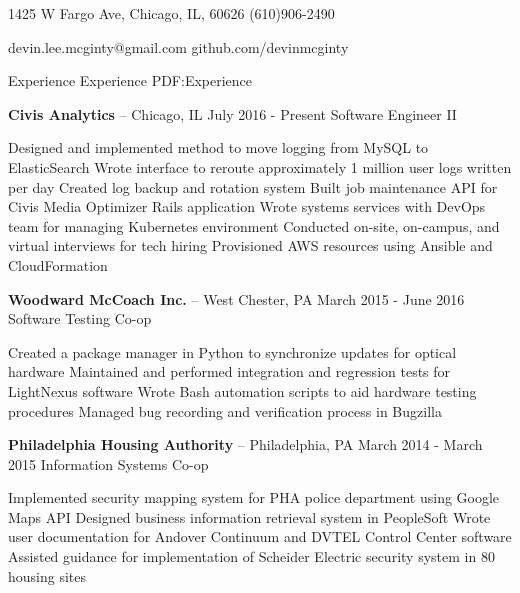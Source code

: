 \documentclass[letterpaper,MMMyyyy,nonstopmode]{simpleresumecv}
\newcommand{\CVAuthor}{Devin McGinty}
\begin{document}

\Title{\CVAuthor}

\bigskip
\begin{SubTitle}
1425 W Fargo Ave, Chicago, IL, 60626
\hfill
(610)906-2490
\par
devin.lee.mcginty@gmail.com
\hfill
github.com/devinmcginty
\end{SubTitle}

\begin{Body}


\Section
{Experience}
{Experience}
{PDF:Experience}

\Gap
\Entry
\textbf{Civis Analytics} -- Chicago, IL
\hfill
July 2016 - Present
\Gap
Software Engineer II
\medskip
\begin{Detail}
    \BulletItem
    Designed and implemented method to move logging from MySQL to ElasticSearch
        \SubBulletItem
        Wrote interface to reroute approximately 1 million user logs written per day
        \SubBulletItem
        Created log backup and rotation system
    \BulletItem
    Built job maintenance API for Civis Media Optimizer Rails application
    \BulletItem
    Wrote systems services with DevOps team for managing Kubernetes environment
    \BulletItem
    Conducted on-site, on-campus, and virtual interviews for tech hiring
    \BulletItem
    Provisioned AWS resources using Ansible and CloudFormation
\end{Detail}

\BigGap
\Entry
\textbf{Woodward McCoach Inc.} -- West Chester, PA
\hfill
March 2015 - June 2016
\Gap
Software Testing Co-op
\medskip
\begin{Detail}
    \BulletItem
    Created a package manager in Python to synchronize updates for optical hardware
    \BulletItem
    Maintained and performed integration and regression tests for LightNexus software
    \BulletItem
    Wrote Bash automation scripts to aid hardware testing procedures
    \BulletItem
    Managed bug recording and verification process in Bugzilla
\end{Detail}

\BigGap
\Entry
\textbf{Philadelphia Housing Authority} -- Philadelphia, PA
\hfill
March 2014 - March 2015
\Gap
Information Systems Co-op
\medskip
\begin{Detail}
    \BulletItem
    Implemented security mapping system for PHA police department using Google Maps API
    \BulletItem
    Designed business information retrieval system in PeopleSoft
    \BulletItem
    Wrote user documentation for Andover Continuum and DVTEL Control Center software
    \BulletItem
    Assisted guidance for implementation of Scheider Electric security system in 80 housing sites
\end{Detail}



\end{Body}
\end{document}
